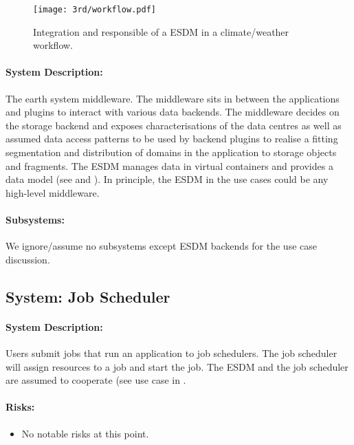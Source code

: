 \begin{figure}
	\centering
	\texttt{[image: 3rd/workflow.pdf]}
	\caption{Integration and responsible of a ESDM in a climate/weather workflow.}
	\label{fig:system esdm}
\end{figure}


\paragraph{System Description:}
The earth system middleware.
The middleware sits in between the applications and plugins to interact with various data backends.
The middleware decides on the storage backend and exposes characterisations of the data centres as well as assumed data access patterns to be used by backend plugins to realise a fitting segmentation and distribution of domains in the application to storage objects and fragments.
The ESDM manages data in virtual containers and provides a data model (see  and ).
In principle, the ESDM in the use cases could be any high-level middleware.


\paragraph{Subsystems:}
We ignore/assume no subsystems except ESDM backends for the use case discussion.







\subsection{System: Job Scheduler}
\label{System: Job Scheduler}

\paragraph{System Description:}
Users submit jobs that run an application to job schedulers.
The job scheduler will assign resources to a job and start the job.
The ESDM and the job scheduler are assumed to cooperate (see use case in .

\paragraph{Risks:}
\begin{itemize}
	\item No notable risks at this point.
\end{itemize}


